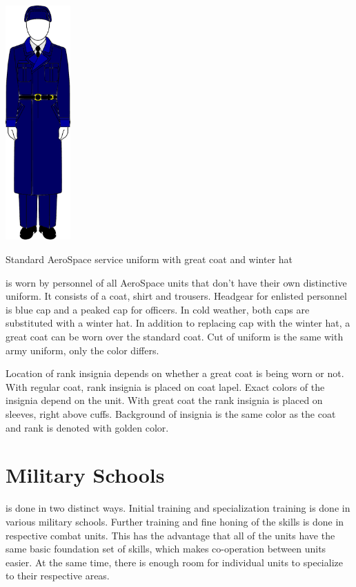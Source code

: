 \documentclass{tufte-book}
\begin{document}
\begin{marginfigure}[0\baselineskip]
  \includegraphics[width=2.5cm]{aerospace_great_coat}
  \caption{Standard AeroSpace service uniform with great coat and winter hat}
  \label{fig:aerospace_great_coat}
\end{marginfigure}

 is worn by personnel of all
AeroSpace units that don't have their own distinctive uniform. It consists of
a coat, shirt and trousers. Headgear for enlisted personnel is blue cap and
a peaked cap for officers. In cold weather, both caps are substituted with
a winter hat. In addition to replacing cap with the winter hat, a great coat
can be worn over the standard coat. Cut of uniform is the same with army
uniform, only the color differs.

Location of rank insignia depends on whether a great coat is being worn or
not. With regular coat, rank insignia is placed on coat lapel. Exact colors
of the insignia depend on the unit. With great coat the rank insignia is
placed on sleeves, right above cuffs. Background of insignia is the same color
as the coat and rank is denoted with golden color.

\section{Military Schools}
\label{sc:military_schools}

 is done in two distinct ways. Initial training and
specialization training is done in various military schools. Further training
and fine honing of the skills is done in respective combat units. This has the
advantage that all of the units have the same basic foundation set of skills,
which makes co-operation between units easier. At the same time, there is
enough room for individual units to specialize to their respective areas.
\end{document}
